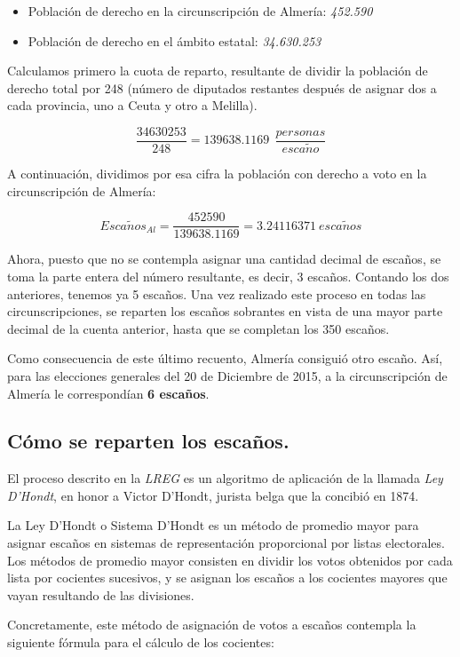 \documentclass[11pt]{article}
\begin{document}
	\begin{itemize}
	\item Población de derecho en la circunscripción de Almería: \textit{452.590}
	\item Población de derecho en el ámbito estatal: \textit{34.630.253}
	\end{itemize}
	
	Calculamos primero la cuota de reparto, resultante de dividir la población de derecho total por 248 (número de diputados restantes después de asignar dos a cada provincia, uno a Ceuta y otro a Melilla).

	$$\dfrac{34630253}{248} = 139638.1169\ \ \frac{personas}{esca\tilde{n}o}$$
	
	A continuación, dividimos por esa cifra la población con derecho a voto en la circunscripción de Almería:
	
	$$Esca\tilde{n}os_{Al} = \dfrac{452590}{139638.1169} = 3.24116371\ esca\tilde{n}os$$

  Ahora, puesto que no se contempla asignar una cantidad decimal de escaños, se toma la parte entera del número resultante, es decir, 3 escaños. Contando los dos anteriores, tenemos ya 5 escaños. Una vez realizado este proceso en todas las circunscripciones, se reparten los escaños sobrantes en vista de una mayor parte decimal de la cuenta anterior, hasta que se completan los 350 escaños.
  
  Como consecuencia de este último recuento, Almería consiguió otro escaño. Así, para las elecciones generales del 20 de Diciembre de 2015, a la circunscripción de Almería le correspondían \textbf{6 escaños}.
  
	\subsection{Cómo se reparten los escaños.}
	
	El proceso descrito en la \textit{LREG} es un algoritmo de aplicación de la llamada \textit{Ley D'Hondt}, en honor a Victor D'Hondt, jurista belga que la concibió en 1874.
	
	La Ley D'Hondt o Sistema D'Hondt es un método de promedio mayor para asignar escaños en sistemas de representación proporcional por listas electorales. Los métodos de promedio mayor consisten en dividir los votos obtenidos por cada lista por cocientes sucesivos, y se asignan los escaños a los cocientes mayores que vayan resultando de las divisiones.
	
	Concretamente, este método de asignación de votos a escaños contempla la siguiente fórmula para el cálculo de los cocientes:
	
\end{document}
